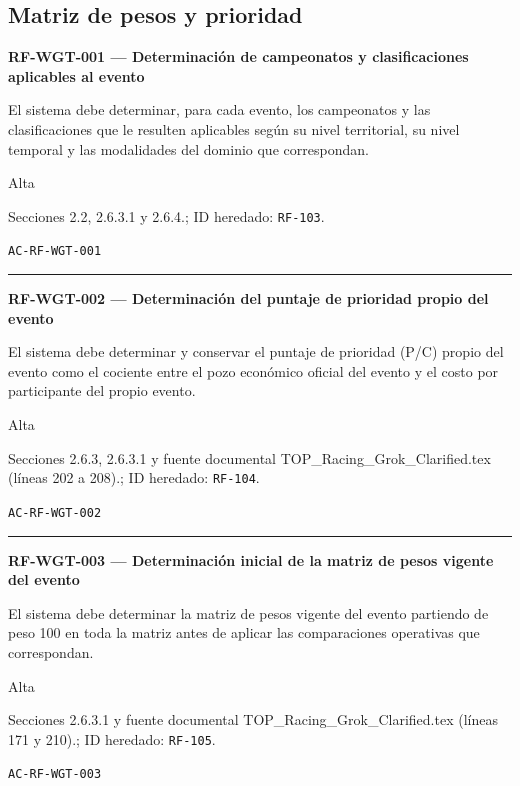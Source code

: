 \documentclass[10pt,letterpaper]{article}
\begin{document}
\subsection{Matriz de pesos y prioridad}
\noindent\textbf{RF-WGT-001 --- Determinación de campeonatos y clasificaciones aplicables al evento}\par
\begin{description}[style=nextline,leftmargin=3.15cm,labelwidth=2.8cm,font=\normalfont\bfseries]
\item[Obligación] El sistema debe determinar, para cada evento, los campeonatos y las clasificaciones que le resulten aplicables según su nivel territorial, su nivel temporal y las modalidades del dominio que correspondan.
\item[Prioridad] Alta
\item[Procedencia] Secciones 2.2, 2.6.3.1 y 2.6.4.; ID heredado: \texttt{RF-103}.
\item[Verificación] \texttt{AC-RF-WGT-001}
\end{description}
\vspace{0.25em}\hrule\vspace{0.65em}
\noindent\textbf{RF-WGT-002 --- Determinación del puntaje de prioridad propio del evento}\par
\begin{description}[style=nextline,leftmargin=3.15cm,labelwidth=2.8cm,font=\normalfont\bfseries]
\item[Obligación] El sistema debe determinar y conservar el puntaje de prioridad (P/C) propio del evento como el cociente entre el pozo económico oficial del evento y el costo por participante del propio evento.
\item[Prioridad] Alta
\item[Procedencia] Secciones 2.6.3, 2.6.3.1 y fuente documental TOP\_Racing\_Grok\_Clarified.tex (líneas 202 a 208).; ID heredado: \texttt{RF-104}.
\item[Verificación] \texttt{AC-RF-WGT-002}
\end{description}
\vspace{0.25em}\hrule\vspace{0.65em}
\noindent\textbf{RF-WGT-003 --- Determinación inicial de la matriz de pesos vigente del evento}\par
\begin{description}[style=nextline,leftmargin=3.15cm,labelwidth=2.8cm,font=\normalfont\bfseries]
\item[Obligación] El sistema debe determinar la matriz de pesos vigente del evento partiendo de peso 100 en toda la matriz antes de aplicar las comparaciones operativas que correspondan.
\item[Prioridad] Alta
\item[Procedencia] Secciones 2.6.3.1 y fuente documental TOP\_Racing\_Grok\_Clarified.tex (líneas 171 y 210).; ID heredado: \texttt{RF-105}.
\item[Verificación] \texttt{AC-RF-WGT-003}
\end{description}
\end{document}
